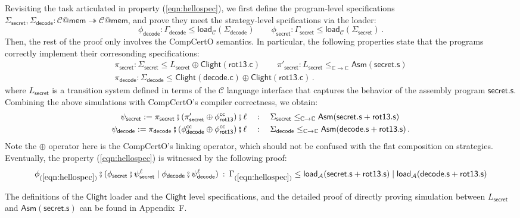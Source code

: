 \documentclass[acmsmall,screen,review,nonacm]{acmart}
\newcommand{\kw}[1]{\ensuremath{ \mathsf{#1} }}
\begin{document}
\begin{example}
Revisiting
the task articulated in property (\ref{eqn:hellospec}),
we first
define the
program-level specifications
$\Sigma_\kw{secret}, \Sigma_\kw{decode} :
\mathcal{C}@\kw{mem} \twoheadrightarrow \mathcal{C}@\kw{mem}$,
and prove
they meet
the strategy-level spcifications
via the loader:
\[
  \phi_\kw{decode}: \Gamma_\kw{decode} \le \kw{load}_\mathcal{C}(\Sigma_\kw{decode})
  \qquad
  \phi_\kw{secret}: \Gamma_\kw{secret} \le \kw{load}_\mathcal{C}(\Sigma_\kw{secret})
  \,.
\]%
Then, the rest of the proof
only involves the CompCertO semantics.
In particular,
the following properties
state that
the programs correctly implement
their corresonding specifications:
\begin{gather*}
  \pi_\kw{secret}: \Sigma_\kw{secret} \le L_\kw{secret} \oplus \kw{Clight}(\kw{rot13.c})
  \qquad
  \pi'_\kw{secret}: L_\kw{secret} \le_{\mathbb{C} \rightarrow \mathbb{C}} \kw{Asm}(\kw{secret.s})
  \\
  \pi_\kw{decode}: \Sigma_\kw{decode} \le \kw{Clight}(\kw{decode.c}) \oplus \kw{Clight}(\kw{rot13.c})
  \,.
\end{gather*}
where $L_\kw{secret}$
is a transition system
defined in terms of the $\mathcal{C}$ language interface
that captures the behavior of
the assembly program $\kw{secret.s}$.
Combining the above simulations
with CompCertO's compiler correctness,
we obtain:
\begin{align*}
   \psi_\kw{secret} := \pi_\kw{secret} \fatsemi
  (\pi'_\kw{secret} \oplus \phi^\kw{cc}_\kw{rot13})
  \fatsemi \ell
  & \quad :\quad \Sigma_\kw{secret} \le_{\mathbb{C} \rightarrow \mathbb{C}}
  \kw{Asm}(\kw{secret.s} + \kw{rot13.s}) \\
   \psi_\kw{decode} := \pi_\kw{decode} \fatsemi
  (\phi^\kw{cc}_\kw{decode} \oplus \phi^\kw{cc}_\kw{rot13})
  \fatsemi \ell
  & \quad :\quad \Sigma_\kw{decode} \le_{\mathbb{C} \rightarrow \mathbb{C}}
  \kw{Asm}(\kw{decode.s} + \kw{rot13.s})
  \,.
\end{align*}
Note the $\oplus$ operator here
is the CompCertO's linking operator,
which should not be confused
with the flat composition
on strategies.
Eventually,
the property (\ref{eqn:hellospec})
is witnessed by the following proof:
\[
 \phi_\kw{(\ref{eqn:hellospec})} \fatsemi
 (\phi_\kw{secret} \fatsemi \psi_\kw{secret}^\ell \mid
 \phi_\kw{decode} \fatsemi \psi_\kw{decode}^\ell) \: : \:
 \Gamma_\kw{(\ref{eqn:hellospec})} \le \kw{load}_\mathcal{A}(\kw{secret.s} + \kw{rot13.s})
 \mid \kw{load}_\mathcal{A}(\kw{decode.s} + \kw{rot13.s})
\]
\end{example}%
The definitions of
the $\kw{Clight}$ loader and
the $\kw{Clight}$ level specifications,
and the detailed proof
of directly proving simulation
between $L_\kw{secret}$ and $\kw{Asm}(\kw{secret.s})$
can be found in Appendix~F.
\end{document}
